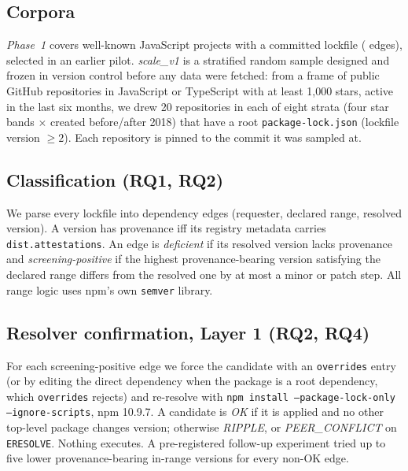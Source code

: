\documentclass[conference]{IEEEtran}
\begin{document}
\subsection{Corpora}
\emph{Phase~1} covers \POneRepos{} well-known JavaScript projects with a
committed lockfile (\POneEdges{} edges), selected in an earlier pilot.
\emph{scale\_v1} is a stratified random sample designed and frozen in
version control before any data were fetched: from a frame of public GitHub
repositories in JavaScript or TypeScript with at least 1,000 stars, active
in the last six months, we drew 20 repositories in each of eight strata
(four star bands $\times$ created before/after 2018) that have a root
\texttt{package-lock.json} (lockfile version $\geq 2$). Each repository is
pinned to the commit it was sampled at.

\subsection{Classification (RQ1, RQ2)}
We parse every lockfile into dependency edges (requester, declared range,
resolved version). A version has provenance iff its registry metadata carries
\texttt{dist.attestations}. An edge is \emph{deficient} if its resolved version
lacks provenance and \emph{screening-positive} if the highest
provenance-bearing version satisfying the declared range differs from the
resolved one by at most a minor or patch step. All range logic uses npm's own
\texttt{semver} library.

\subsection{Resolver confirmation, Layer 1 (RQ2, RQ4)}
For each screening-positive edge we force the candidate with an
\texttt{overrides} entry (or by editing the direct dependency when the package
is a root dependency, which \texttt{overrides} rejects) and re-resolve with
\texttt{npm install --package-lock-only --ignore-scripts}, npm 10.9.7. A
candidate is \emph{OK} if it is applied and no other top-level package changes
version; otherwise \emph{RIPPLE}, or \emph{PEER\_CONFLICT} on
\texttt{ERESOLVE}. Nothing executes. A pre-registered follow-up experiment tried up to five lower
provenance-bearing in-range versions for every non-OK edge.
\end{document}
